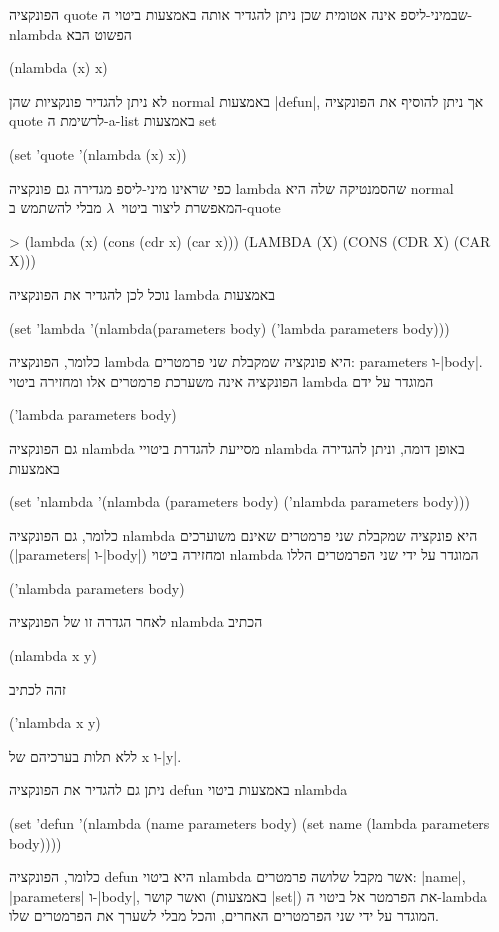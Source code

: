 הפונקציה quote שבמיני-ליספ אינה אטומית שכן ניתן להגדיר אותה באמצעות ביטוי
ה-nlambda הפשוט הבא
\begin{LISP}
(nlambda (x) x)
\end{LISP}
לא ניתן להגדיר פונקציות שהן normal באמצעות \E|defun|, אך ניתן להוסיף את הפונקציה
quote לרשימת ה-a-list באמצעות set
\begin{LIBRARY}
(set 'quote '(nlambda (x) x))
\end{LIBRARY}
כפי שראינו מיני-ליספ מגדירה גם פונקציה lambda שהסמנטיקה שלה היא normal המאפשרת
ליצור ביטוי~$λ$ מבלי להשתמש ב-quote
\begin{LISP}
> (lambda (x) (cons (cdr x) (car x)))
(LAMBDA (X) (CONS (CDR X) (CAR X)))
\end{LISP}
נוכל לכן להגדיר את הפונקציה lambda באמצעות
\begin{LIBRARY}
(set 'lambda '(nlambda(parameters body) ('lambda parameters body)))
\end{LIBRARY}
כלומר, הפונקציה lambda היא פונקציה שמקבלת שני פרמטרים: parameters
ו-\E|body|. הפונקציה אינה משערכת פרמטרים אלו ומחזירה ביטוי lambda המוגדר על ידם
\begin{LISP}
  ('lambda parameters body)
\end{LISP}
גם הפונקציה nlambda מסייעת להגדרת ביטויי nlambda באופן דומה, וניתן להגדירה
באמצעות
\begin{LIBRARY}
(set 'nlambda '(nlambda (parameters body) ('nlambda parameters body)))
\end{LIBRARY}
כלומר, גם הפונקציה nlambda היא פונקציה שמקבלת שני פרמטרים שאינם משוערכים
(\E|parameters| ו-\E|body|) ומחזירה ביטוי nlambda המוגדר על ידי
שני הפרמטרים הללו
\begin{LISP}
  ('nlambda parameters body)
\end{LISP}
לאחר הגדרה זו של הפונקציה nlambda הכתיב
\begin{LISP}
  (nlambda x y)
\end{LISP}
זהה לכתיב
\begin{LISP}
  ('nlambda x y)
\end{LISP}
ללא תלות בערכיהם של x ו-\E|y|.

ניתן גם להגדיר את הפונקציה defun באמצעות ביטוי nlambda
\begin{LIBRARY}
(set 'defun '(nlambda (name parameters body)
  (set name (lambda parameters body))))
\end{LIBRARY}
כלומר, הפונקציה defun היא ביטוי nlambda אשר מקבל שלושה פרמטרים: \E|name|,
\E|parameters| ו-\E|body|, ואשר קושר (באמצעות \E|set|) את הפרמטר אל ביטוי
ה-lambda המוגדר על ידי שני הפרמטרים האחרים, והכל מבלי לשערך את הפרמטרים שלו.

